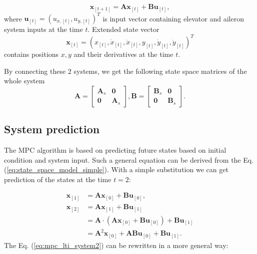 \documentclass[a4paper,11pt,titlepage]{article}
\begin{document}
\begin{equation}
\label{eq:state_space_model_simple}
\textbf{x}_{[t+1]} = \textbf{A} \textbf{x}_{[t]} +\textbf{B} \textbf{u}_{[t]},
\end{equation}
where $\textbf{u}_{[t]} = (u_{x,[t]}, u_{y,[t]})^T$ is input vector containing elevator and aileron system inputs at the time $t$. Extended state vector 
\begin{equation}
\textbf{x}_{[t]} = (x_{[t]}, \dot{x}_{[t]}, \ddot{x}_{[t]}, y_{[t]}, \dot{y}_{[t]}, \ddot{y}_{[t]})^T
\end{equation}
contains positions $x,y$ and their derivatives at the time $t$. 

By connecting these 2 systems, we get the following state space matrices of the whole system
\begin{equation}
\label{eq:state_space}
\textbf{A} = \begin{bmatrix}
	\textbf{A}_s & \textbf{0}	\\
	\textbf{0}   & \textbf{A}_s
\end{bmatrix}, \textbf{B} = \begin{bmatrix}
	\textbf{B}_s & \textbf{0}	\\
	\textbf{0}   & \textbf{B}_s
\end{bmatrix}.
\end{equation}









\subsection{System prediction}
The MPC algorithm is based on predicting future states based on initial condition and system input. Such a general equation can be derived from the Eq. (\ref{eq:state_space_model_simple}). With a simple substitution we can get prediction of the states at the time $t = 2$:

\begin{equation}
\begin{split}
\label{eq:mpc_lti_system2}
\textbf{x}_{[1]} &= \textbf{A}\textbf{x}_{[0]} + \textbf{B}\textbf{u}_{[0]},\\
\textbf{x}_{[2]} &= \textbf{A}\textbf{x}_{[1]} + \textbf{B}\textbf{u}_{[1]}\\
&= \textbf{A}\cdot(\textbf{A}\textbf{x}_{[0]} + \textbf{B}\textbf{u}_{[0]}) + \textbf{B}\textbf{u}_{[1]} \\
&=\textbf{A}^2\textbf{x}_{[0]} + \textbf{A}\textbf{B}\textbf{u}_{[0]} + \textbf{B} \textbf{u}_{[1]}.
\end{split}
\end{equation}
The Eq. (\ref{eq:mpc_lti_system2}) can be rewritten in a more general way:
\end{document}
